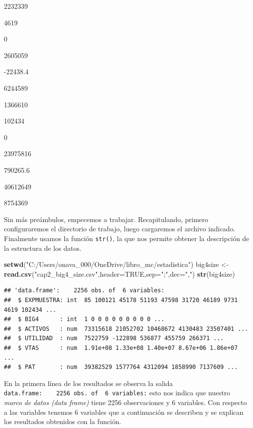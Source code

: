 \documentclass[]{book}
\newenvironment{Shaded}{\begin{snugshade}}{\end{snugshade}}
\newcommand{\KeywordTok}[1]{\textcolor[rgb]{0.13,0.29,0.53}{\textbf{#1}}}
\newcommand{\DataTypeTok}[1]{\textcolor[rgb]{0.13,0.29,0.53}{#1}}
\newcommand{\StringTok}[1]{\textcolor[rgb]{0.31,0.60,0.02}{#1}}
\newcommand{\OtherTok}[1]{\textcolor[rgb]{0.56,0.35,0.01}{#1}}
\newcommand{\NormalTok}[1]{#1}
\begin{document}
2232339

4619

0

2605059

-22438.4

6244589

1366610

102434

0

23975816

790265.6

40612649

8754369

Sin más preámbulos, empecemos a trabajar. Recapitulando, primero
configuraremos el directorio de trabajo, luego cargaremos el archivo
indicado. Finalmente usamos la función \texttt{str()}, la que nos
permite obtener la descripción de la estructura de los datos.

\begin{Shaded}
\begin{Highlighting}[]
\KeywordTok{setwd}\NormalTok{(}\StringTok{"C:/Users/onava_000/OneDrive/libro_mc/estadistica"}\NormalTok{)}
\NormalTok{big4size <-}\StringTok{ }\KeywordTok{read.csv}\NormalTok{(}\StringTok{"cap2_big4_size.csv"}\NormalTok{,}\DataTypeTok{header=}\OtherTok{TRUE}\NormalTok{,}\DataTypeTok{sep=}\StringTok{";"}\NormalTok{,}\DataTypeTok{dec=}\StringTok{","}\NormalTok{)}
\KeywordTok{str}\NormalTok{(big4size)}
\end{Highlighting}
\end{Shaded}

\begin{verbatim}
## 'data.frame':    2256 obs. of  6 variables:
##  $ EXPMUESTRA: int  85 100121 45178 51193 47598 31720 46189 9731 4619 102434 ...
##  $ BIG4      : int  1 0 0 0 0 0 0 0 0 0 ...
##  $ ACTIVOS   : num  73315618 21052702 10468672 4130483 23507401 ...
##  $ UTILIDAD  : num  7522759 -122898 536877 455759 266371 ...
##  $ VTAS      : num  1.91e+08 1.33e+08 1.40e+07 8.67e+06 1.86e+07 ...
##  $ PAT       : num  39382529 1577764 4312094 1858990 7137609 ...
\end{verbatim}

En la primera línea de los resultados se observa la salida
\texttt{\textquotesingle{}data.frame\textquotesingle{}:\ \ \ \ 2256\ obs.\ of\ \ 6\ variables:}
esto nos indica que nuestro \emph{marco de datos (data frame)} tiene
2256 observaciones y 6 variables. Con respecto a las variables tenemos 6
variables que a continuación se describen y se explican los resultados
obtenidos con la función.
\end{document}
